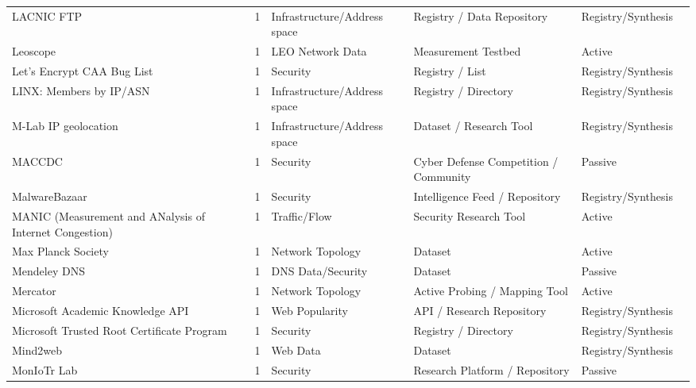 \begin{table}[h!]
\begin{tabular}{lllllll}
LACNIC FTP & \cite{lacnicftp} & 1 & Infrastructure/Address space & Registry / Data Repository & Registry/Synthesis & \cite{10.1145/3487552.3487838} \\
Leoscope & \cite{leoscope} & 1 & LEO Network Data & Measurement Testbed & Active & \cite{10.1145/3777912.3839805} \\
Let's Encrypt CAA Bug List & \cite{lets_encrypt_caa_bug} & 1 & Security & Registry / List & Registry/Synthesis & \cite{10.1007/978-3-030-72582-2_10} \\
LINX: Members by IP/ASN & \cite{linx_members} & 1 & Infrastructure/Address space & Registry / Directory & Registry/Synthesis & \cite{10.1007/978-3-030-98785-5_16} \\
M-Lab IP geolocation & \cite{mlab_geolocation} & 1 & Infrastructure/Address space & Dataset / Research Tool & Registry/Synthesis & \cite{10.1145/3646547.3688441} \\
MACCDC & \cite{maccdc} & 1 & Security & Cyber Defense Competition / Community & Passive & \cite{10.1145/3487552.3487856} \\
MalwareBazaar & \cite{malwarebazaar} & 1 & Security & Intelligence Feed / Repository & Registry/Synthesis & \cite{10.1145/3517745.3561463} \\
MANIC (Measurement and ANalysis of Internet Congestion) & \cite{manic} & 1 & Traffic/Flow & Security Research Tool & Active & \cite{10.1007/978-3-030-98785-5_7} \\
Max Planck Society & \cite{edmond} & 1 & Network Topology & Dataset & Active & \cite{10.1007/978-3-032-18268-5_5} \\
Mendeley DNS & \cite{mendeley} & 1 & DNS Data/Security & Dataset & Passive & \cite{10.1145/3777912.3839801} \\
Mercator & \cite{832534} & 1 & Network Topology & Active Probing / Mapping Tool & Active & \cite{10.1145/3487552.3487812} \\
Microsoft Academic Knowledge API & \cite{academicknowledge} & 1 & Web Popularity & API / Research Repository & Registry/Synthesis & \cite{10.1145/3487552.3487821} \\
Microsoft Trusted Root Certificate Program & \cite{microsoftroot} & 1 & Security & Registry / Directory & Registry/Synthesis & \cite{10.1145/3646547.3688415} \\
Mind2web & \cite{mind2web} & 1 & Web Data & Dataset & Registry/Synthesis & \cite{10.1145/3777912.3839788} \\
MonIoTr Lab & \cite{moniotr} & 1 & Security & Research Platform / Repository & Passive & \cite{10.1145/3618257.3624830} \\

\end{tabular}
\end{table}
